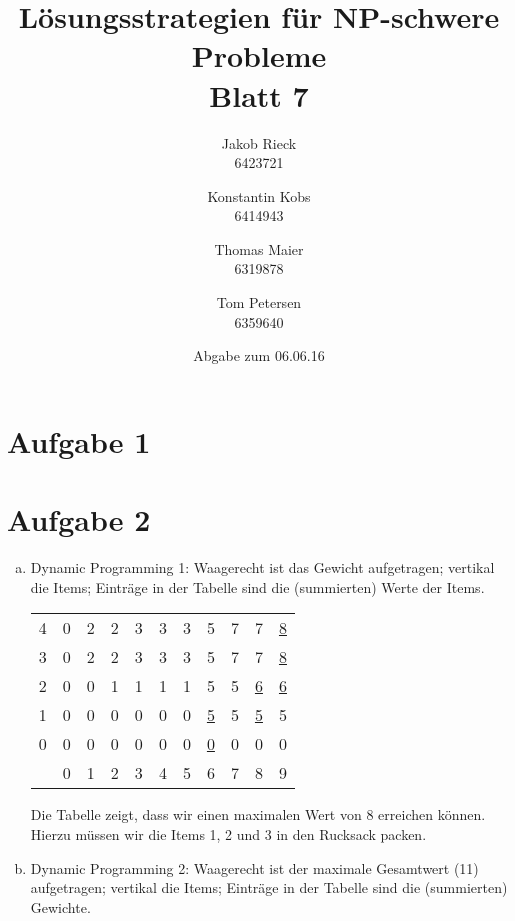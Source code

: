 \documentclass[12pt,a4paper]{article}
\title{Lösungsstrategien für NP-schwere Probleme\\Blatt 7}
\author{
		Jakob Rieck\\
		\small{6423721}
	\and
		Konstantin Kobs\\
		\small{6414943}
	\and
		Thomas Maier\\
		\small{6319878}
	\and
		Tom Petersen\\
		\small{6359640}
}
\date{Abgabe zum 06.06.16}
\begin{document}
\maketitle

\section*{Aufgabe 1}


\section*{Aufgabe 2}

 \begin{enumerate}[a)]
 	\item Dynamic Programming 1: Waagerecht ist das Gewicht aufgetragen; vertikal die Items; Einträge in der Tabelle sind die (summierten) Werte der Items.
 		
 		\begin{table}[hbt]
  		\begin{tabular}{l|cccccccccc}
  	 	 	4 & 0 & 2 & 2 & 3 & 3 & 3 & 5 & 7 & 7 & \underline{8} \\
	    	3 & 0 & 2 & 2 & 3 & 3 & 3 & 5 & 7 & 7 & \underline{8} \\
	    	2 & 0 & 0 & 1 & 1 & 1 & 1 & 5 & 5 & \underline{6} & \underline{6} \\
	    	1 & 0 & 0 & 0 & 0 & 0 & 0 & \underline{5} & 5 & \underline{5} & 5 \\
	    	0 & 0 & 0 & 0 & 0 & 0 & 0 & \underline{0} & 0 & 0 & 0 \\
	    	\hline
	    	  & 0 & 1 & 2 & 3 & 4 & 5 & 6 & 7 & 8 & 9 \\
  		\end{tabular}
		\end{table}
		
		Die Tabelle zeigt, dass wir einen maximalen Wert von 8 erreichen können. Hierzu müssen wir die Items 1, 2 und 3 in den Rucksack packen.

 	
 	\item Dynamic Programming 2: Waagerecht ist der maximale Gesamtwert (11) aufgetragen; vertikal die Items; Einträge in der Tabelle sind die (summierten) Gewichte.
 		

\end{enumerate}
\end{document}
